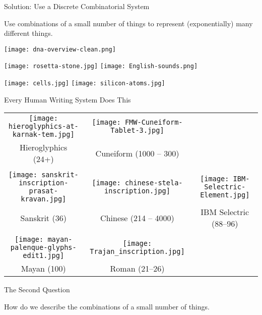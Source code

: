 \documentclass{plt}
\begin{document}
\begin{frame}{Solution: Use a Discrete Combinatorial System}

Use \alert{combinations} of a \alert{small number of things} to
represent (exponentially) many different things.

\begin{minipage}{0.2\textwidth}
\texttt{[image: dna-overview-clean.png]}
\end{minipage}%
\begin{minipage}{0.8\textwidth}
\hfill
\texttt{[image: rosetta-stone.jpg]} \hfill
\texttt{[image: English-sounds.png]}

\hfill
\texttt{[image: cells.jpg]}
\hfill
\texttt{[image: silicon-atoms.jpg]}
\end{minipage}

\end{frame}

\begin{frame}[fragile]{Every Human Writing System Does This}

\tiny

\begin{tabular}{ccc}
\texttt{[image: hieroglyphics-at-karnak-tem.jpg]} &
\texttt{[image: FMW-Cuneiform-Tablet-3.jpg]} \\
Hieroglyphics (24+) & Cuneiform (1000 -- 300) \\ \\
\texttt{[image: sanskrit-inscription-prasat-kravan.jpg]}
&
\texttt{[image: chinese-stela-inscription.jpg]}
&
\texttt{[image: IBM-Selectric-Element.jpg]}
\\
Sanskrit (36) & Chinese (214 -- 4000) & IBM Selectric (88--96) \\ \\
\texttt{[image: mayan-palenque-glyphs-edit1.jpg]} &
\texttt{[image: Trajan\_inscription.jpg]} \\
Mayan (100) & Roman (21--26) \\
\end{tabular}

\end{frame}

\begin{frame}{The Second Question}
  \begin{center}
  How do we describe the \alert{combinations} of a \alert{small number of things}.

  \end{center}
\end{frame}
\end{document}
